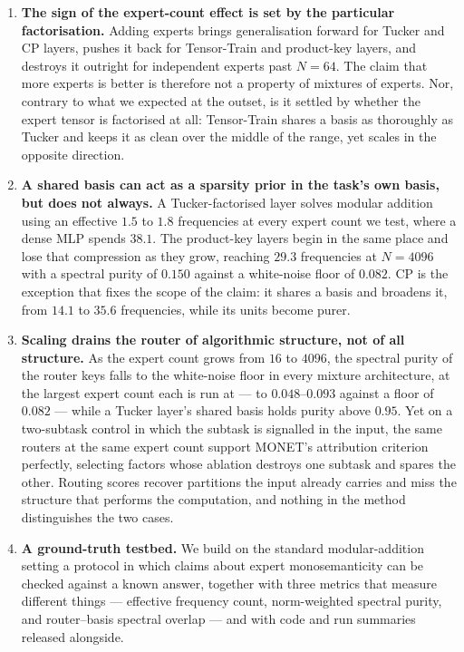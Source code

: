 \begin{enumerate}
\item \textbf{The sign of the expert-count effect is set by the particular
  factorisation.} Adding experts brings generalisation forward for Tucker and
  CP layers, pushes it back for Tensor-Train and product-key layers, and
  destroys it outright for independent experts past $N = 64$. The claim that
  more experts is better is therefore not a property of mixtures of experts.
  Nor, contrary to what we expected at the outset, is it settled by whether
  the expert tensor is factorised at all: Tensor-Train shares a basis as
  thoroughly as Tucker and keeps it as clean over the middle of the range, yet
  scales in the opposite direction.

\item \textbf{A shared basis can act as a sparsity prior in the task's own
  basis, but does not always.} A Tucker-factorised layer solves modular
  addition using an effective $1.5$ to $1.8$ frequencies at every expert count
  we test, where a dense MLP spends $38.1$. The product-key layers begin in
  the same place and lose that compression as they grow, reaching $29.3$
  frequencies at $N = 4096$ with a spectral purity of $0.150$ against a
  white-noise floor of $0.082$. CP is the exception that fixes the scope of
  the claim: it shares a basis and broadens it, from $14.1$ to $35.6$
  frequencies, while its units become purer.

\item \textbf{Scaling drains the router of algorithmic structure, not of all
  structure.} As the expert count grows from $16$ to $4096$, the spectral
  purity of the router keys falls to the white-noise floor in every mixture
  architecture, at the largest expert count each is run at --- to
  $0.048$--$0.093$ against a floor of $0.082$ --- while a Tucker layer's
  shared basis holds purity above $0.95$. Yet on a two-subtask control in
  which the subtask is signalled in the input, the same routers at the same
  expert count support MONET's attribution criterion perfectly, selecting
  factors whose ablation destroys one subtask and spares the other. Routing
  scores recover partitions the input already carries and miss the structure
  that performs the computation, and nothing in the method distinguishes the
  two cases.

\item \textbf{A ground-truth testbed.} We build on the standard
  modular-addition setting a protocol in which claims about expert
  monosemanticity can be checked against a known answer, together with three
  metrics that measure different things --- effective frequency count,
  norm-weighted spectral purity, and router--basis spectral overlap --- and
  with code and run summaries released alongside.
\end{enumerate}

